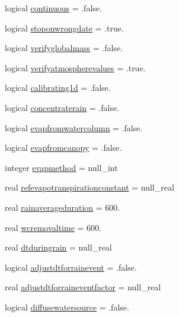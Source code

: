 \begin{DoxyCompactItemize}
\item 
logical \mbox{\hyperlink{structmodulebasin_1_1t__basin_a99d032145620d295e3d908dd8890bf62}{continuous}} = .false.
\item 
logical \mbox{\hyperlink{structmodulebasin_1_1t__basin_ab96a6f72dfafb8e21433d4c65f095c91}{stoponwrongdate}} = .true.
\item 
logical \mbox{\hyperlink{structmodulebasin_1_1t__basin_a4243562ac53475e489ff23c0bb47ff91}{verifyglobalmass}} = .false.
\item 
logical \mbox{\hyperlink{structmodulebasin_1_1t__basin_a4792f47b62ffb0e7f2207811dfbcba21}{verifyatmospherevalues}} = .true.
\item 
logical \mbox{\hyperlink{structmodulebasin_1_1t__basin_a319998df098c6ae444537cd1b82e073b}{calibrating1d}} = .false.
\item 
logical \mbox{\hyperlink{structmodulebasin_1_1t__basin_ab5d1d2c36727a7db80fb7edbcf810fd9}{concentraterain}} = .false.
\item 
logical \mbox{\hyperlink{structmodulebasin_1_1t__basin_a9ba0bee0222ad2c0458ec051f774ed0d}{evapfromwatercolumn}} = .false.
\item 
logical \mbox{\hyperlink{structmodulebasin_1_1t__basin_a8ed349547e5a726a572aa4525b374d6c}{evapfromcanopy}} = .false.
\item 
integer \mbox{\hyperlink{structmodulebasin_1_1t__basin_a2305c7d671de88be01b12008a2463708}{evapmethod}} = null\+\_\+int
\item 
real \mbox{\hyperlink{structmodulebasin_1_1t__basin_ac8d1c1700d1686cac8dfd8545891db7e}{refevapotranspirationconstant}} = null\+\_\+real
\item 
real \mbox{\hyperlink{structmodulebasin_1_1t__basin_a4d96cb191fd2bfc81dc464b8ea5c4ee2}{rainaverageduration}} = 600.
\item 
real \mbox{\hyperlink{structmodulebasin_1_1t__basin_a3e215249267cf3921366c2fb37d8e42a}{wcremovaltime}} = 600.
\item 
real \mbox{\hyperlink{structmodulebasin_1_1t__basin_a29f3c557c1b7c8d31dd9a3660e435af4}{dtduringrain}} = null\+\_\+real
\item 
logical \mbox{\hyperlink{structmodulebasin_1_1t__basin_a849be999bbaabd03070de3e029b5c2db}{adjustdtforrainevent}} = .false.
\item 
real \mbox{\hyperlink{structmodulebasin_1_1t__basin_ae2e9bd236e278ff4bba11a407c34d562}{adjustdtforraineventfactor}} = null\+\_\+real
\item 
logical \mbox{\hyperlink{structmodulebasin_1_1t__basin_ab586262ec54ef8eb4afe052e2d1e9aec}{diffusewatersource}} = .false.

\end{DoxyCompactItemize}
